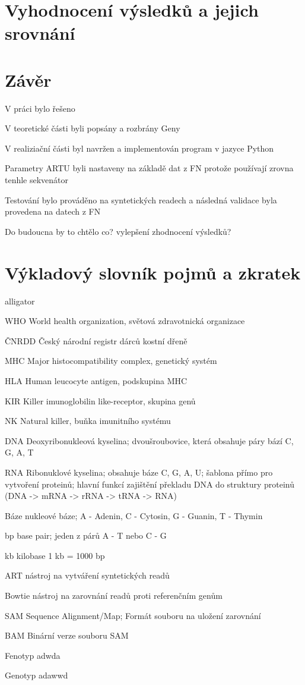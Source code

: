 \documentclass[czech,DP]{thesiskiv}
\numberwithin{equation}{section}
\begin{document}
\chapter{Vyhodnocení výsledků a jejich srovnání}
\chapter{Závěr}
V práci bylo řešeno 

V teoretické části byli popsány a rozbrány Geny 

V realiziační části byl navržen a implementován program v jazyce Python 

Parametry ARTU byli nastaveny na základě dat z FN protože používají zrovna tenhle sekvenátor

Testování bylo prováděno na syntetických readech a následná validace byla provedena na datech z FN

Do budoucna by to chtělo co?
vylepšení zhodnocení výsledků?
\chapter{Výkladový slovník pojmů a zkratek}

\begin{labeling}{alligator}
	\item [WHO] World health organization, světová zdravotnická organizace
	\item [ČNRDD] Český národní registr dárců kostní dřeně
	\item [MHC] Major histocompatibility complex, genetický systém	
	\item [HLA] Human leucocyte antigen, podskupina MHC
	\item [KIR] Killer imunoglobilin like-receptor, skupina genů
	\item [NK] Natural killer, buňka imunitního systému
	\item [DNA] Deoxyribonukleová kyselina; dvoušroubovice, která obsahuje páry bází C, G, A, T 
	\item [RNA] Ribonuklové kyselina; obsahuje báze C, G, A, U; šablona přímo pro vytvoření proteinů; hlavní funkcí zajištění překladu DNA do struktury proteinů (DNA -> mRNA -> rRNA -> tRNA -> RNA) 
	\item [Báze] nukleové báze; A - Adenin, C - Cytosin, G - Guanin, T - Thymin
	\item [bp] base pair; jeden z párů A - T nebo C - G
	\item [kb] kilobase 1 kb = 1000 bp
	\item [ART] nástroj na vytváření syntetických readů
	\item [Bowtie] nástroj na zarovnání readů proti referenčním genům
	\item [SAM] Sequence Alignment/Map; Formát souboru na uložení zarovnání
	\item [BAM] Binární verze souboru SAM
	\item [Fenotyp] adwda
	\item [Genotyp] adawwd
\end{labeling}
\end{document}
